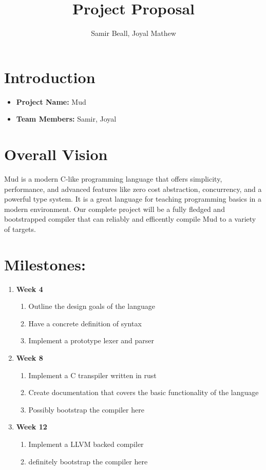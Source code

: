 \documentclass{article}
\begin{document}
\title{Project Proposal}
\author{Samir Beall, Joyal Mathew}
\maketitle

\section{Introduction}
\begin{itemize}
    \item \textbf{Project Name:} Mud
    \item \textbf{Team Members:} Samir, Joyal
\end{itemize}
\section{Overall Vision}
Mud is a modern C-like programming language that offers simplicity, performance, and advanced features like zero cost abstraction, concurrency, and a powerful type system. It is a great language for teaching programming basics in a modern environment. Our complete project will be a fully fledged and bootstrapped compiler that can reliably and efficently compile Mud to a variety of targets.

\section{Milestones:}
\begin{enumerate}
    \item \textbf{Week 4}
        \begin{enumerate}
            \item Outline the design goals of the language
            \item Have a concrete definition of syntax
            \item Implement a prototype lexer and parser
        \end{enumerate}
    \item \textbf{Week 8}
        \begin{enumerate}
            \item Implement a C transpiler written in rust
            \item Create documentation that covers the basic functionality of the language
            \item Possibly bootstrap the compiler here
        \end{enumerate}
    \item \textbf{Week 12}
        \begin{enumerate}
            \item Implement a LLVM backed compiler
            \item definitely bootstrap the compiler here
        \end{enumerate}
\end{enumerate}
\end{document}
